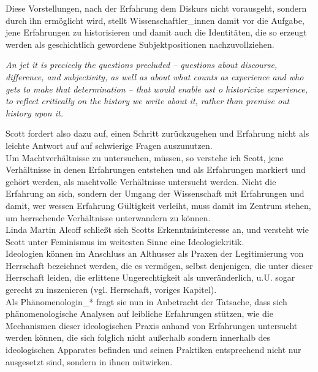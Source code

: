 Diese Vorstellungen, nach der Erfahrung dem Diskurs nicht vorausgeht, sondern
durch ihn ermöglicht wird, stellt Wissenschaftler\_innen damit vor die Aufgabe,
jene Erfahrungen zu historisieren und damit auch die Identitäten, die so
erzeugt werden als geschichtlich gewordene Subjektpositionen nachzuvollziehen. 

\begin{myenv}
 \textit{\glqq 
 An jet it is precicely the questions precluded – questions about discourse, difference, and subjectivity, as well as about what counts as experience and who gets to make that determination – that would enable ust o historicize experience, to reflect critically on the history we write about it, rather than premise out history upon it. 
 \grqq}
\footnotemark {}
\end{myenv}

Scott fordert also dazu auf, einen Schritt zurückzugehen und Erfahrung nicht
als leichte Antwort auf auf schwierige Fragen auszunutzen.
\\
 Um Machtverhältnisse
zu untersuchen, müssen, so verstehe ich Scott, jene Verhältnisse in denen
Erfahrungen entstehen und als Erfahrungen markiert und gehört werden, als
machtvolle Verhältnisse untersucht werden. Nicht die Erfahrung an sich, sondern
der Umgang der Wissenschaft mit Erfahrungen und damit, wer wessen Erfahrung
Gültigkeit verleiht, muss damit im Zentrum stehen, um herrschende Verhältnisse
unterwandern zu können.
\\

Linda Martin Alcoff schließt sich Scotts Erkenntnisinteresse an, und versteht
wie Scott unter Feminismus im weitesten Sinne eine Ideologiekritik.\\
Ideologien
können im Anschluss an Althusser als Praxen der Legitimierung von Herrschaft
bezeichnet werden, die es vermögen, selbst denjenigen, die unter dieser
Herrschaft leiden, die erlittene Ungerechtigkeit als unveränderlich, u.U. sogar
gerecht zu inszenieren (vgl. Herrschaft, voriges Kapitel). \\
Als Phänomenologin\_* fragt sie
nun in Anbetracht der Tatsache, dass sich phänomenologische Analysen auf
leibliche Erfahrungen stützen, wie die Mechanismen dieser ideologischen Praxis
anhand von Erfahrungen untersucht werden können, die sich folglich nicht
außerhalb sondern innerhalb des ideologischen Apparates befinden und seinen
Praktiken entsprechend nicht nur ausgesetzt sind, sondern in ihnen mitwirken.\\

